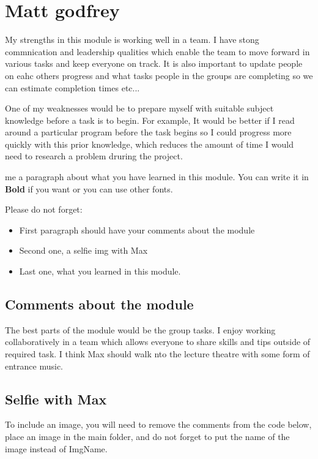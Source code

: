 \section{Matt godfrey}
My strengths in this module is working well in a team. I have stong commnication and leadership qualities which enable the team to move forward in various tasks and keep everyone on track. It is also important to update people on eahc others progress and what tasks people in the groups are completing so we can estimate completion times etc...

One of my weaknesses would be to prepare myself with suitable subject knowledge before a task is to begin. For example, It would be better if I read around a particular program before the task begins so I could progress more quickly with this prior knowledge, which reduces the amount of time I would need to research a problem druring the project. 

me a paragraph about what you have learned in this module. You can write it in \textbf{Bold} if you want or you can use other fonts. 

Please do not forget:
\begin{itemize}
	\item First paragraph should have your comments about the module
	\item Second one, a selfie img with Max
	\item Last one, what you learned in this module.
\end{itemize}

\subsection{Comments about the module}

The best parts of the module would be the group tasks. I enjoy working collaboratively in a team which allows everyone to share skills and tips outside of required task. I think Max should walk nto the  lecture theatre with some form of entrance music. 

\subsection{Selfie with Max}

To include an image, you will need to remove the comments from the code below, place an image in the main folder, and do not forget to put the name of the image instead of ImgName. 


